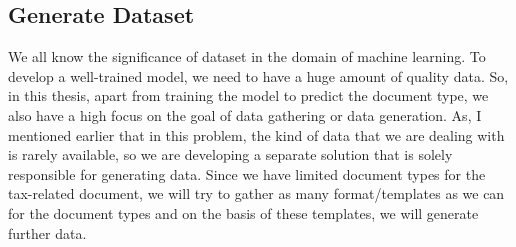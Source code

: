 \subsection{Generate Dataset}
We all know the significance of dataset in the domain of machine learning. To develop a well-trained model, we need to have a huge amount of quality data. So, in this thesis, apart from training the model to predict the document type, we also have a high focus on the goal of data gathering or data generation. As, I mentioned earlier that in this problem, the kind of data that we are dealing with is rarely available, so we are developing a separate solution that is solely responsible for generating data. Since we have limited document types for the tax-related document, we will try to gather as many format/templates as we can for the document types and on the basis of these templates, we will generate further data.
\par
